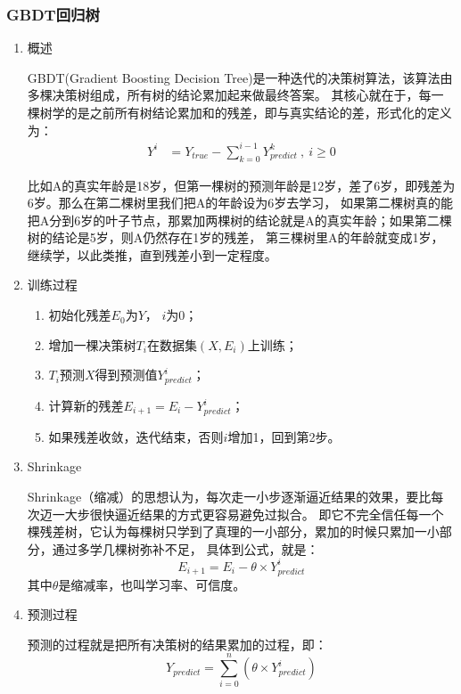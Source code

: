 \documentclass[UTF8,a4paper,12pt]{article}
\begin{document}
\subsubsection{GBDT回归树}
\begin{enumerate}[itemindent=0.5em,label=\arabic*、]
  \item 概述
  \par \qquad GBDT(Gradient Boosting Decision Tree)是一种迭代的决策树算法，该算法由多棵决策树组成，所有树的结论累加起来做最终答案。
  其核心就在于，每一棵树学的是之前所有树结论累加和的残差，即与真实结论的差，形式化的定义为：
  \begin{equation}
    \begin{aligned}
      Y^{i} &= Y_{true} - \sum_{k=0}^{i-1}Y^k_{predict}\ ,\ i \ge 0
    \end{aligned}
  \end{equation}
  \par \qquad 比如A的真实年龄是18岁，但第一棵树的预测年龄是12岁，差了6岁，即残差为6岁。那么在第二棵树里我们把A的年龄设为6岁去学习，
  如果第二棵树真的能把A分到6岁的叶子节点，那累加两棵树的结论就是A的真实年龄；如果第二棵树的结论是5岁，则A仍然存在1岁的残差，
  第三棵树里A的年龄就变成1岁，继续学，以此类推，直到残差小到一定程度。

  \item 训练过程
    \begin{enumerate}[itemindent=0.5em,label=(\arabic*)]
      \item 初始化残差$E_0$为$Y$， $i$为0；
      \item 增加一棵决策树$T_i$在数据集$(X, E_i)$上训练；
      \item $T_i$预测$X$得到预测值$Y^i_{predict}$；
      \item 计算新的残差$E_{i+1}=E_i - Y^i_{predict}$；
      \item 如果残差收敛，迭代结束，否则$i$增加1，回到第2步。
    \end{enumerate}

  \item Shrinkage
  \par \qquad Shrinkage（缩减）的思想认为，每次走一小步逐渐逼近结果的效果，要比每次迈一大步很快逼近结果的方式更容易避免过拟合。
即它不完全信任每一个棵残差树，它认为每棵树只学到了真理的一小部分，累加的时候只累加一小部分，通过多学几棵树弥补不足，
具体到公式，就是：
  \begin{equation}
    E_{i+1}=E_i - \theta \times Y^i_{predict}
  \end{equation}
  其中$\theta$是缩减率，也叫学习率、可信度。
\item 预测过程
\par \qquad 预测的过程就是把所有决策树的结果累加的过程，即：
\begin{equation}
  Y_{predict} = \sum_{i=0}^{n}(\theta \times Y^i_{predict})
\end{equation}
\end{enumerate}
\end{document}
